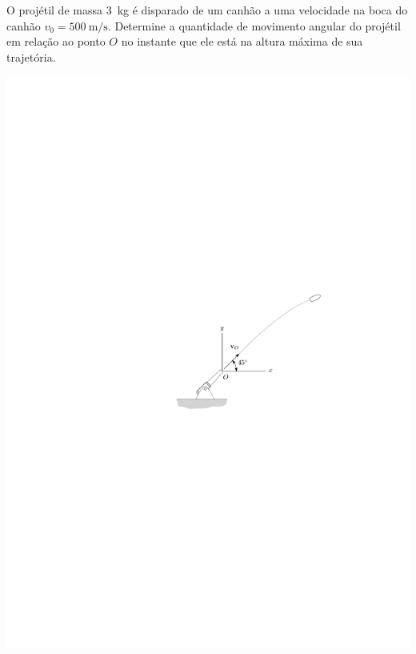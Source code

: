 \item O projétil de massa \SI{3}{\kilogram} é disparado de um canhão a uma velocidade na boca do canhão $v_{0}=\SI{500}{\meter/\second}$. Determine a quantidade de movimento angular do projétil em relação ao ponto $O$ no instante que ele está na altura máxima de sua trajetória.

\vspace{-.6cm}
\begin{flushright}
	\includegraphics[scale=1.3]{images/draw_6}
\end{flushright}